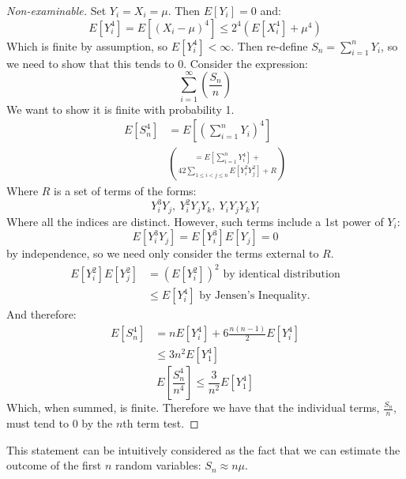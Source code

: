 \documentclass[../Main.tex]{subfiles}
\begin{document}
\begin{proof}[Non-examinable]
    Set $Y_i = X_i = \mu$. Then $E[Y_i] = 0$ and:
    \begin{equation*}
        E[Y_i^4] = E[(X_i - \mu)^4] \leq 2^4 \left(E[X_i^4] + \mu^4\right)
    \end{equation*}
    Which is finite by assumption, so $E[Y_i^4] < \infty$.
    Then re-define $S_n = \sum_{i = 1}^n Y_i$, so we need to show that this tends to $0$.
    Consider the expression:
    \begin{equation*}
        \sum_{i = 1}^\infty \left(\frac{S_n}{n}\right)
    \end{equation*}
    We want to show it is finite with probability 1.
    \begin{align*}
        E[S_n^4] &= E\left[\left(\sum_{i = 1}^n Y_i\right)^4\right] \\
        &= E\left[\sum_{i = 1}^n Y_i^4\right] + \choose{4}{2} \sum_{1 \leq i < j \leq n} E[Y_i^2 Y_j^2] + R
    \end{align*}
    Where $R$ is a set of terms of the forms:
    \begin{equation*}
        Y_i^3 Y_j,~Y_i^2 Y_j Y_k,~Y_i Y_j Y_k Y_l
    \end{equation*}
    Where all the indices are distinct. However, such terms include a 1st power of $Y_i$:
    \begin{equation*}
        E[Y_i^3 Y_j] = E[Y_i^3] E[Y_j] = 0
    \end{equation*}
    by independence, so we need only consider the terms external to $R$.
    \begin{align*}
        E[Y_i^2] E[Y_j^2] &= \left(E[Y_i^2]\right)^2 \text{ by identical distribution} \\
        &\leq E[Y_i^4] \text{ by Jensen's Inequality.}
    \end{align*}
    And therefore:
    \begin{align*}
        E[S_n^4] &= n E[Y_i^4] + 6 \frac{n(n-1)}{2} E[Y_i^4] \\
        &\leq 3n^2 E[Y_1^4]
    \end{align*}
    \begin{equation*}
        E\left[\frac{S_n^4}{n^4}\right] \leq \frac{3}{n^2} E[Y_1^4]
    \end{equation*}
    Which, when summed, is finite. Therefore we have that the individual terms, $\frac{S_n}{n}$, must tend to 0 by the $n$th term test.
\end{proof}
\begin{remark}
    This statement can be intuitively considered as the fact that we can estimate the outcome of the first $n$ random variables: $S_n \approx n\mu$.
\end{remark}
\end{document}
